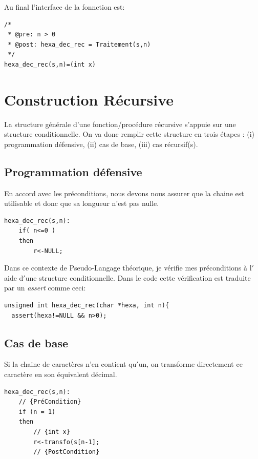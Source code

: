 \documentclass[a4paper, 11pt, oneside]{article}
\begin{document}
Au final l'interface de la fonnction est:

\begin{lstlisting}
/* 
 * @pre: n > 0
 * @post: hexa_dec_rec = Traitement(s,n)
 */
hexa_dec_rec(s,n)=(int x)
\end{lstlisting}


\section{Construction Récursive}\label{recur}

La structure générale d’une fonction/procédure récursive s’appuie sur une 
structure conditionnelle. On va donc remplir cette structure en trois étapes : 
(i) programmation défensive, (ii) cas de base, (iii) cas récursif(s).

\subsection{Programmation défensive}


En accord avec les préconditions, nous devons nous assurer que la chaine est
utilisable et donc que sa longueur n'est pas nulle. 

\begin{lstlisting}
hexa_dec_rec(s,n):
    if( n<=0 )
    then 
        r<-NULL;
\end{lstlisting}

Dans ce contexte de Pseudo-Langage théorique, je vérifie mes préconditions à 
l$'$aide d$'$une structure conditionnelle. Dans le code cette vérification est traduite par un \textit{assert} comme ceci:

\begin{lstlisting}
unsigned int hexa_dec_rec(char *hexa, int n){
  assert(hexa!=NULL && n>0);
\end{lstlisting}


\subsection{Cas de base}


Si la chaine de caractères n'en contient qu$'$un, on transforme directement ce 
caractère en son équivalent décimal.

\begin{lstlisting}
hexa_dec_rec(s,n):
    // {PréCondition}
    if (n = 1)
    then
        // {int x}
        r<-transfo(s[n-1];
        // {PostCondition}
\end{lstlisting}
\end{document}
